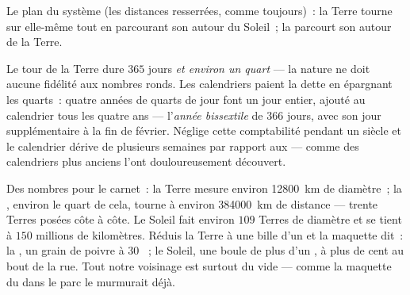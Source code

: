 \begin{omfigure}

{\small Le plan du système (les distances resserrées, comme
toujours)~: la Terre tourne sur elle-même tout en parcourant son
 autour du Soleil~; la  parcourt son  autour de la
Terre.}
\end{omfigure}

\begin{example}\label{ex:g6:sun-earth-moon:leap}
Le tour de la Terre dure $365$ jours \emph{et environ un quart} ---
la nature ne doit aucune fidélité aux nombres ronds. Les calendriers
paient la dette en épargnant les quarts~: quatre années de quarts de
jour font un jour entier, ajouté au calendrier tous les quatre ans
--- l'\emph{année bissextile} de $366$ jours, avec son jour
supplémentaire à la fin de février. Néglige cette comptabilité
pendant un siècle et le calendrier dérive de plusieurs semaines par
rapport aux  --- comme des calendriers plus anciens l'ont
douloureusement découvert.
\end{example}

\begin{example}\label{ex:g6:sun-earth-moon:scale}
Des nombres pour le carnet~: la Terre mesure environ \qty{12800}{km}
de diamètre~; la , environ le quart de cela, tourne à environ
\qty{384000}{km} de distance --- trente Terres posées côte à côte. Le
Soleil fait environ $109$ Terres de diamètre et se tient à $150$
millions de kilomètres. Réduis la Terre à une bille d'un 
et la maquette dit~: la , un grain de poivre à $30$ ~;
le Soleil, une boule de plus d'un , à plus de cent  au
bout de la rue. Tout notre voisinage est surtout du vide --- comme la
maquette du  dans le parc le murmurait déjà.
\end{example}

